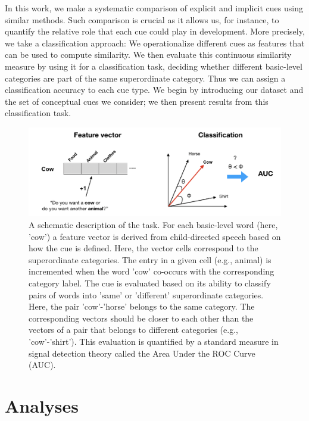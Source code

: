 \documentclass[10pt, letterpaper]{article}
\newenvironment{CodeChunk}{}{}
\begin{document}
In this work, we make a systematic comparison of explicit and implicit
cues using similar methods. Such comparison is crucial as it allows us,
for instance, to quantify the relative role that each cue could play in
development. More precisely, we take a classification approach: We
operationalize different cues as features that can be used to compute
similarity. We then evaluate this continuous similarity measure by using
it for a classification task, deciding whether different basic-level
categories are part of the same superordinate category. Thus we can
assign a classification accuracy to each cue type. We begin by
introducing our dataset and the set of conceptual cues we consider; we
then present results from this classification task.

\begin{CodeChunk}
\begin{figure}[h]

{\centering \includegraphics{cogsci_files/figure-latex/task-1} 

}

\caption{\label{fig:task} A schematic description of the task. For each basic-level word (here, 'cow') a feature vector is derived from child-directed speech based on how the cue is defined. Here, the vector cells correspond to the superordinate categories. The entry in a given cell (e.g., animal) is incremented when the word 'cow' co-occurs with the corresponding category label. The cue is evaluated based on its ability to classify pairs of words into 'same' or 'different' superordinate categories. Here, the pair 'cow'-'horse' belongs to the same category. The corresponding vectors should be closer to each other than the vectors of a pair that belongs to different categories (e.g., 'cow'-'shirt'). This evaluation is quantified by a standard measure in signal detection theory called the Area Under the ROC Curve (AUC).}\label{fig:task}
\end{figure}
\end{CodeChunk}

\hypertarget{analyses}{%
\section{Analyses}\label{analyses}}
\end{document}
